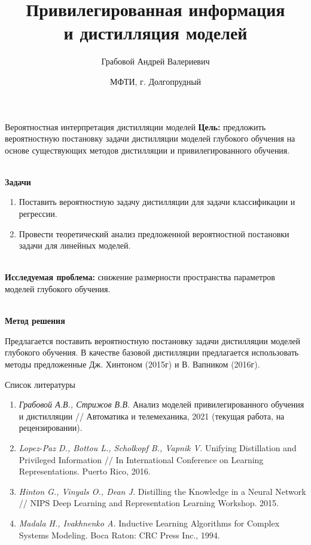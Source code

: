 \documentclass[10pt,pdf,hyperref={unicode}]{beamer}
\title[\hbox to 56mm{Дистилляция и привилегированная информация \hfill\insertframenumber\,/\,\inserttotalframenumber}]
{Привилегированная информация\\
и дистилляция моделей}
\author[А.\,В.~Грабовой]{\large Грабовой Андрей Валериевич}
\institute{\large
Московский физико-технический институт}
\date{\footnotesize{МФТИ, г. Долгопрудный}}
\begin{document}
\begin{frame}
\titlepage
\end{frame}

\begin{frame}{Вероятностная интерпретация дистилляции моделей}
\justifying
\textbf{Цель:} предложить вероятностную постановку задачи дистилляции моделей глубокого обучения на основе существующих методов дистилляции и привилегированного обучения.

~\\
\textbf{Задачи}

\begin{enumerate}
\justifying
	\item Поставить вероятностную задачу дистилляции для задачи классификации и регрессии.
	\item Провести теоретический анализ предложенной вероятностной постановки задачи для линейных моделей.
\end{enumerate}

~\\
\textbf{Исследуемая проблема:} снижение размерности пространства параметров моделей глубокого обучения.

~\\
\textbf{Метод решения}

	Предлагается поставить вероятностную постановку задачи дистилляции моделей глубокого обучения. В качестве базовой дистилляции предлагается использовать методы предложенные Дж. Хинтоном (2015г) и В. Вапником (2016г).
	
\end{frame}

\begin{frame}{Список литературы}
\justifying
\begin{enumerate}
	\item \textit{Грабовой А.В., Стрижов В.В.} Анализ моделей привилегированного обучения и дистилляции // Автоматика и телемеханика, 2021 (текущая работа, на рецензировании).
	\item \textit{Lopez-Paz D., Bottou L., Scholkopf B., Vapnik V.} Unifying Distillation and Privileged Information // In International Conference on Learning Representations. Puerto Rico, 2016.
	\item \textit{Hinton G., Vinyals O., Dean J.} Distilling the Knowledge in a Neural Network // NIPS Deep Learning and Representation Learning Workshop. 2015.
	\item \textit{Madala H., Ivakhnenko A.} Inductive Learning Algorithms for Complex Systems Modeling. Boca Raton: CRC Press Inc., 1994.
\end{enumerate}
\end{frame}
\end{document}
